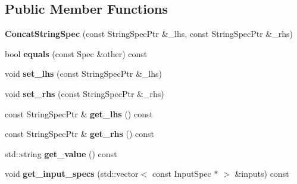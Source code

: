 \subsection*{Public Member Functions}
\begin{DoxyCompactItemize}
\item 
\hypertarget{classgiskard__suturo_1_1ConcatStringSpec_a0b8d5a0c2a61926325669d0d709b8d9a}{{\bfseries Concat\-String\-Spec} (const String\-Spec\-Ptr \&\-\_\-lhs, const String\-Spec\-Ptr \&\-\_\-rhs)}\label{classgiskard__suturo_1_1ConcatStringSpec_a0b8d5a0c2a61926325669d0d709b8d9a}

\item 
\hypertarget{classgiskard__suturo_1_1ConcatStringSpec_aefc0b111d6ee941e10d03e4931d8995b}{bool {\bfseries equals} (const Spec \&other) const }\label{classgiskard__suturo_1_1ConcatStringSpec_aefc0b111d6ee941e10d03e4931d8995b}

\item 
\hypertarget{classgiskard__suturo_1_1ConcatStringSpec_ab6c037eb7ce4bf0bd84e53970d651221}{void {\bfseries set\-\_\-lhs} (const String\-Spec\-Ptr \&\-\_\-lhs)}\label{classgiskard__suturo_1_1ConcatStringSpec_ab6c037eb7ce4bf0bd84e53970d651221}

\item 
\hypertarget{classgiskard__suturo_1_1ConcatStringSpec_ad615f74c07e64b711b56a2ad4e5910f8}{void {\bfseries set\-\_\-rhs} (const String\-Spec\-Ptr \&\-\_\-rhs)}\label{classgiskard__suturo_1_1ConcatStringSpec_ad615f74c07e64b711b56a2ad4e5910f8}

\item 
\hypertarget{classgiskard__suturo_1_1ConcatStringSpec_ab6cb19aa13a159072231fb6ff3a0b1b8}{const String\-Spec\-Ptr \& {\bfseries get\-\_\-lhs} () const }\label{classgiskard__suturo_1_1ConcatStringSpec_ab6cb19aa13a159072231fb6ff3a0b1b8}

\item 
\hypertarget{classgiskard__suturo_1_1ConcatStringSpec_ac03a56e5989f4747b047d873d93e1efc}{const String\-Spec\-Ptr \& {\bfseries get\-\_\-rhs} () const }\label{classgiskard__suturo_1_1ConcatStringSpec_ac03a56e5989f4747b047d873d93e1efc}

\item 
\hypertarget{classgiskard__suturo_1_1ConcatStringSpec_a5a0695881b721252a5c97e5cb4a0956d}{std\-::string {\bfseries get\-\_\-value} () const }\label{classgiskard__suturo_1_1ConcatStringSpec_a5a0695881b721252a5c97e5cb4a0956d}

\item 
\hypertarget{classgiskard__suturo_1_1ConcatStringSpec_a778ac0bcc93a4007f008d00aa00febd3}{void {\bfseries get\-\_\-input\-\_\-specs} (std\-::vector$<$ const Input\-Spec $\ast$ $>$ \&inputs) const }\label{classgiskard__suturo_1_1ConcatStringSpec_a778ac0bcc93a4007f008d00aa00febd3}

\end{DoxyCompactItemize}
